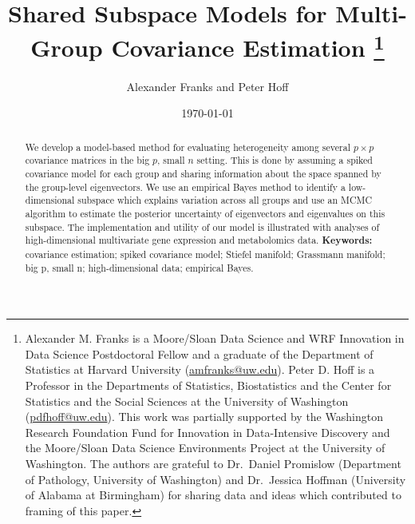 \documentclass[12pt]{article}
\begin{document}
\title{Shared Subspace Models for Multi-Group Covariance Estimation
%
  \protect\thanks{Alexander M. Franks is a Moore/Sloan Data Science
    and WRF Innovation in Data Science Postdoctoral Fellow and a
    graduate of the Department of Statistics at Harvard University
    (\href{mailto:amfranks@uw.edu}{amfranks@uw.edu}).  Peter D. Hoff
    is a Professor in the Departments of Statistics, Biostatistics and
    the Center for Statistics and the Social Sciences at the
    University of Washington
    (\href{mailto:pdhoff@uw.edu}{pdfhoff@uw.edu}).
%
This work was partially supported 
 by the Washington Research Foundation Fund for Innovation in Data-Intensive Discovery and the Moore/Sloan Data Science Environments Project at the University of Washington.
%
 The authors are grateful to Dr.\ Daniel Promislow (Department of
 Pathology, University of Washington) and Dr.\ Jessica Hoffman
 (University of Alabama at Birmingham) for sharing data and ideas
 which contributed to framing of this paper.}}
\author{Alexander Franks and Peter Hoff} \date{\today}
\maketitle 

\begin{abstract}


  We develop a model-based method for evaluating heterogeneity among
  several $p\times p$ covariance matrices in the big $p$, small $n$ setting.
  This is done by assuming a spiked covariance model for each group
  and sharing information about the space spanned by the group-level
  eigenvectors.  We use an empirical Bayes method to identify a low-dimensional
  subspace which explains variation across all groups and use an MCMC
  algorithm to estimate the posterior uncertainty of eigenvectors and
  eigenvalues on this subspace.  The implementation and utility of our
  model is illustrated with analyses of high-dimensional multivariate
  gene expression and metabolomics data.
\vfill
\noindent\textbf{Keywords:} covariance estimation; spiked covariance
model; Stiefel manifold; Grassmann manifold; big p, small n;
high-dimensional data; empirical Bayes.
\end{abstract}
\end{document}
